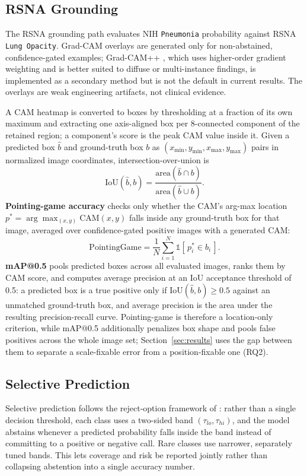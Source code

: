 \subsection{RSNA Grounding}

The RSNA grounding path evaluates NIH \texttt{Pneumonia} probability against RSNA \texttt{Lung Opacity}. Grad-CAM \citep{selvaraju2017gradcam} overlays are generated only for non-abstained, confidence-gated examples; Grad-CAM++ \citep{chattopadhay2018gradcampp}, which uses higher-order gradient weighting and is better suited to diffuse or multi-instance findings, is implemented as a secondary method but is not the default in current results. The overlays are weak engineering artifacts, not clinical evidence.

A CAM heatmap is converted to boxes by thresholding at a fraction of its own maximum and
extracting one axis-aligned box per 8-connected component of the retained region; a
component's score is the peak CAM value inside it. Given a predicted box $\hat{b}$ and
ground-truth box $b$ as $(x_{\min}, y_{\min}, x_{\max}, y_{\max})$ pairs in normalized
image coordinates, intersection-over-union is
\[
  \mathrm{IoU}(\hat{b}, b) = \frac{\mathrm{area}(\hat{b} \cap b)}{\mathrm{area}(\hat{b} \cup b)}.
\]
\textbf{Pointing-game accuracy} checks only whether the CAM's arg-max location
$p^{*} = \arg\max_{(x,y)} \mathrm{CAM}(x,y)$ falls inside any ground-truth box for that
image, averaged over confidence-gated positive images with a generated CAM:
\[
  \mathrm{PointingGame} = \frac{1}{N}\sum_{i=1}^{N} \mathbb{1}\!\left[\, p^{*}_i \in b_i \,\right].
\]
\textbf{mAP@0.5} pools predicted boxes across all evaluated images, ranks them by CAM
score, and computes average precision at an IoU acceptance threshold of 0.5: a predicted
box is a true positive only if $\mathrm{IoU}(\hat{b}, b) \geq 0.5$ against an
unmatched ground-truth box, and average precision is the area under the resulting
precision-recall curve. Pointing-game is therefore a location-only criterion, while
mAP@0.5 additionally penalizes box shape and pools false positives across the whole
image set; Section~\ref{sec:results} uses the gap between them to separate a
scale-fixable error from a position-fixable one (RQ2).

\subsection{Selective Prediction}

Selective prediction follows the reject-option framework of \citet{geifman2017selective}: rather than a single decision threshold, each class uses a two-sided band $(\tau_{lo}, \tau_{hi})$, and the model abstains whenever a predicted probability falls inside the band instead of committing to a positive or negative call. Rare classes use narrower, separately tuned bands. This lets coverage and risk be reported jointly rather than collapsing abstention into a single accuracy number.


